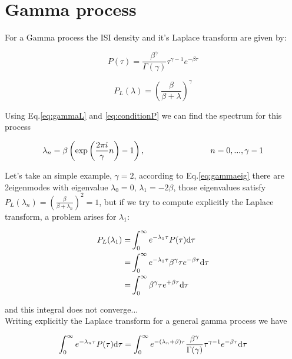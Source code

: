 \documentclass[a4paper,12pt,twoside]{article}
\def \dd  {{\rm d}}
\begin{document}
\section{Gamma process}

For a Gamma process the ISI density and it's  Laplace transform  are given by:

\begin{equation}
\label{eq:gamma}
P(\tau)=\frac{\beta^\gamma}{\Gamma(\gamma)}\tau^{\gamma-1}e^{-\beta\tau}
\end{equation}

\begin{equation}
\label{eq:gammaL}
P_L(\lambda)=\left(\frac{\beta}{\beta +\lambda}\right)^\gamma
\end{equation}

Using Eq.\eqref{eq:gammaL} and \eqref{eq:conditionP} we can find the spectrum  for this process

\begin{equation}
\label{eq:gammaeig}
\lambda_n=\beta\left(\exp\left(\frac{2\pi i}{\gamma}n\right)-1\right), \hspace{2.8cm}  n=0,..., \gamma-1
\end{equation}


Let's take an simple example, $\gamma=2$, according to Eq.\eqref{eq:gammaeig} there are 2eigenmodes with eigenvalue $\lambda_0=0$, $\lambda_1=-2\beta$, those eigenvalues satisfy$P_L(\lambda_n)=\left(\frac{\beta}{\beta +\lambda_n}\right)^2=1$, but if we try to compute explicitly the Laplace transform, a problem arises for $\lambda_1$:

\begin{eqnarray}
P_L(\lambda_1)=&\int_0^\infty e^{-\lambda_1 \tau}P(\tau)\dd\tau\\
=&\int_0^\infty e^{-\lambda_1 \tau}\beta^\gamma\tau e^{-\beta\tau}\dd\tau\\
=&\int_0^\infty\beta^\gamma\tau e^{+\beta\tau}\dd\tau
\end{eqnarray}

and this integral does not converge... \\


Writing explicitly the Laplace transform  for a general gamma process we have

\begin{equation}
\int_0^\infty e^{-\lambda_n \tau}P(\tau)\dd\tau
=\int_0^\infty e^{-(\lambda_n+\beta) \tau} \frac{\beta^\gamma}{\Gamma(\gamma)}\tau^{\gamma-1}e^{-\beta\tau}\dd\tau
\end{equation}
\end{document}
